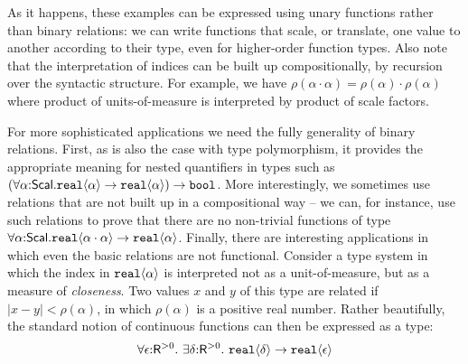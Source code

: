 As it happens, these examples can be expressed using unary functions
rather than binary relations: we can write functions that scale, or
translate, one value to another according to their type, even for
higher-order function types. Also note that the interpretation of
indices can be built up compositionally, by recursion over the
syntactic structure. For example, we have $\rho(\alpha\cdot\alpha) =
\rho(\alpha)\cdot\rho(\alpha)$ where product of units-of-measure is interpreted by
product of scale factors.

For more sophisticated applications we need the fully generality of
binary relations. First, as is also the case with type polymorphism,
it provides the appropriate meaning for nested quantifiers in types
such as
$(\forall\alpha\mathord:\mathsf{Scal}.\textup{\texttt{real}}\langle \alpha \rangle\to\textup{\texttt{real}}\langle \alpha \rangle)\to\texttt{bool}$.
More interestingly, we sometimes use relations that are not built up
in a compositional way -- we can, for instance, use such relations to
prove that there are no non-trivial functions of type
$\forall\alpha\mathord:\mathsf{Scal}.\textup{\texttt{real}}\langle \alpha\cdot\alpha \rangle\to\textup{\texttt{real}}\langle \alpha \rangle$.
Finally, there are interesting applications in which even the basic
relations are not functional. Consider a type system in which the
index in $\textup{\texttt{real}}\langle \alpha \rangle$ is interpreted not as a
unit-of-measure, but as a measure of \emph{closeness}. Two values $x$
and $y$ of this type are related if $|x-y| < \rho(\alpha)$, in which
$\rho(\alpha)$ is a positive real number.  Rather beautifully, the
standard notion of continuous functions can then be expressed as a
type:
\begin{displaymath}
  \forall \epsilon \mathord: \mathsf{R}^{>0}.\ \exists \delta\mathord: \mathsf{R}^{>0}.\ \tyPrim{real}{\delta} \to \tyPrim{real}{\epsilon}
\end{displaymath}






